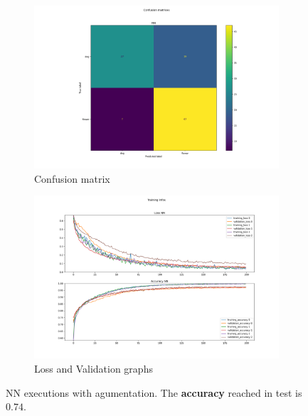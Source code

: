 \documentclass{report}
\begin{document}
\begin{figure}[t!]
  \centering
  \hspace{-2cm}
  \begin{subfigure}[t]{0.49\textwidth}
    \centering
    \includegraphics[width=1.3\textwidth]{1.augmentationNN/conf_mat.png}
    \caption{Confusion matrix}
    \label{fig:image-set3-sub1}
  \end{subfigure}
  \hspace{-0.5cm}
  \begin{subfigure}[t]{0.49\textwidth}
    \centering
    \includegraphics[width=1.3\textwidth]{1.augmentationNN/training_infos.png}
    \caption{Loss and Validation graphs}
    \label{fig:image-set3-sub2}
  \end{subfigure}

  \caption{NN executions with agumentation. The \textbf{accuracy} reached in test is $0.74$.}
  \label{fig:image-set3}
\end{figure}
\end{document}

